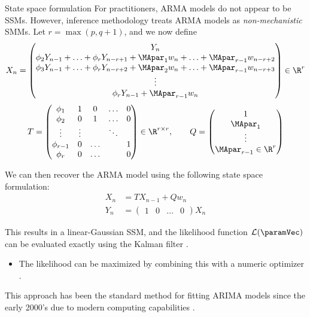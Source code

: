 \documentclass[aspectratio=169]{beamer}\usepackage[]{graphicx}\usepackage[]{xcolor}
\begin{document}
\begin{frame}[allowframebreaks]{State space formulation}
  For practitioners, ARMA models do not appear to be SSMs.
  However, inference methodology treats ARMA models as \emph{non-mechanistic} SMMs. Let $r = \max(p, q+1)$, and we now define
  \begin{equation*}
    X_n = \begin{pmatrix}
  Y_n \\
  \phi_2 Y_{n - 1} + \ldots + \phi_r Y_{n - r + 1} + \MApar_{1}w_{n} + \ldots + \MApar_{r - 1}w_{n - r + 2} \\
    \phi_3 Y_{n - 1} + \ldots + \phi_r Y_{n - r + 2} + \MApar_{2}w_{n} + \ldots + \MApar_{r - 1}w_{n - r + 3} \\
    \vdots \\
    \phi_r Y_{n - 1} + \MApar_{r - 1}w_n
  \end{pmatrix} \in \R^r
  \end{equation*}
  \begin{equation*}
  T = \begin{pmatrix}
\phi_1 & 1 & 0 & \ldots & 0 \\
\phi_2 & 0 & 1 & \ldots & 0 \\
\vdots & \vdots & & \ddots & \\
\phi_{r-1} & 0 & \ldots &  & 1 \\
\phi_r & 0 & \ldots & & 0
\end{pmatrix} \in \R^{r \times r}, \quad\quad
Q = \begin{pmatrix}
  1 \\ \MApar_1 \\ \vdots \\ \MApar_{r - 1} \in \R^r
\end{pmatrix}
  \end{equation*}

We can then recover the ARMA model using the following state space formulation:
\begin{align*}
  X_n &= TX_{n - 1} + Qw_n \\
  Y_n &= \begin{pmatrix} 1 & 0 & \ldots & 0\end{pmatrix} X_n
\end{align*}

This results in a linear-Gaussian SSM, and the likelihood function $\mathcal{L}(\paramVec)$ can be evaluated exactly using the Kalman filter \citep{kalman60}.
\begin{itemize}
  \item The likelihood can be maximized by combining this with a numeric optimizer \citep{gardner1980}.
\end{itemize}

This approach has been the standard method for fitting ARIMA models since the early 2000's due to modern computing capabilities \citep{ripley2002}. 

\end{frame}
\end{document}
